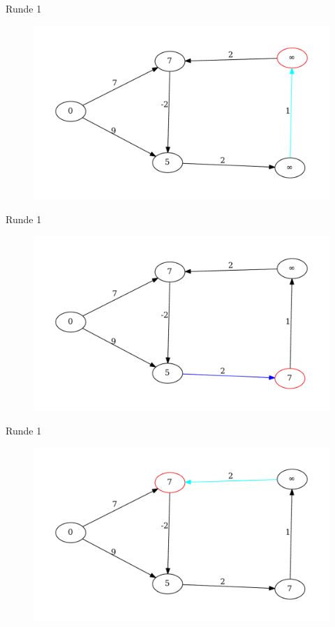 \begin{frame}{Runde 1}
\begin{figure}[htbp]
\centering
\includegraphics[width=\linewidth]{bellman_ford_graphs/graph_04.pdf}
\end{figure}
\end{frame}

\begin{frame}{Runde 1}
\begin{figure}[htbp]
\centering
\includegraphics[width=\linewidth]{bellman_ford_graphs/graph_05.pdf}
\end{figure}
\end{frame}

\begin{frame}{Runde 1}
\begin{figure}[htbp]
\centering
\includegraphics[width=\linewidth]{bellman_ford_graphs/graph_06.pdf}
\end{figure}
\end{frame}


